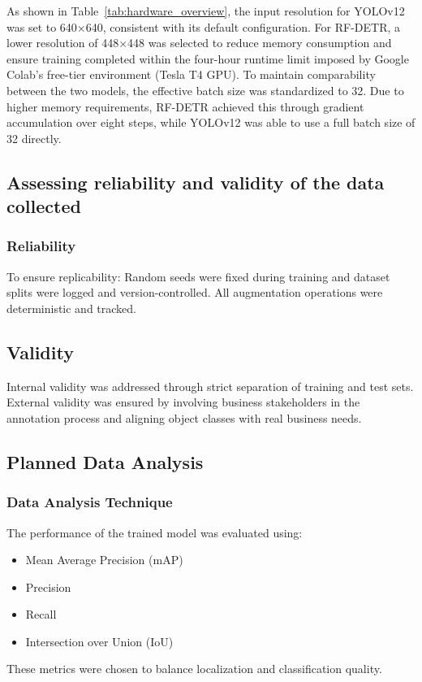 \documentclass[a4paper,10pt,twocolumn]{article}
\numberwithin{figure}{section}
\numberwithin{table}{section}
\begin{document}
As shown in Table~\ref{tab:hardware_overview}, the input resolution 
for YOLOv12 was set to 640×640, consistent with its default 
configuration. For RF-DETR, a lower resolution of 448×448 
was selected to reduce memory consumption and ensure training 
completed within the four-hour runtime limit imposed by Google 
Colab’s free-tier environment (Tesla T4 GPU). To maintain 
comparability between the two models, the effective batch
size was standardized to 32. Due to higher memory requirements, 
RF-DETR achieved this through gradient accumulation over eight 
steps, while YOLOv12 was able to use a full batch size of 32 
directly.



\subsection{Assessing reliability and validity of the data collected}

\subsubsection{Reliability}
To ensure replicability:
Random seeds were fixed during training and 
dataset splits were logged and version-controlled. 
All augmentation operations were deterministic and tracked.

\subsection{Validity}
Internal validity was addressed through strict separation 
of training and test sets. External validity was ensured 
by involving business stakeholders in the annotation 
process and aligning object classes with 
real business needs.


\subsection{Planned Data Analysis}

\subsubsection{Data Analysis Technique}
The performance of the trained model was evaluated using:
\begin{itemize} 
    \item Mean Average Precision (mAP)
    \item Precision
    \item Recall
    \item Intersection over Union (IoU)
\end{itemize} 
These metrics were chosen to balance 
localization and classification quality.
\end{document}
